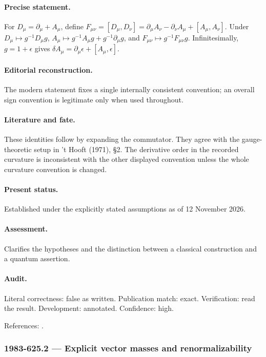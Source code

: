 \paragraph{Precise statement.} For \(D_\mu=\partial_\mu+A_\mu\), define \(F_{\mu\nu}=[D_\mu,D_\nu]=\partial_\mu A_\nu-\partial_\nu A_\mu+[A_\mu,A_\nu]\). Under \(D_\mu\mapsto g^{-1}D_\mu g\), \(A_\mu\mapsto g^{-1}A_\mu g+g^{-1}\partial_\mu g\), and \(F_{\mu\nu}\mapsto g^{-1}F_{\mu\nu}g\). Infinitesimally, \(g=1+\epsilon\) gives \(\delta A_\mu=\partial_\mu\epsilon+[A_\mu,\epsilon]\).

\paragraph{Editorial reconstruction.} The modern statement fixes a single internally consistent convention; an overall sign convention is legitimate only when used throughout.

\paragraph{Literature and fate.} These identities follow by expanding the commutator. They agree with the gauge-theoretic setup in ’t Hooft (1971), \S2. The derivative order in the recorded curvature is inconsistent with the other displayed convention unless the whole curvature convention is changed.

\paragraph{Present status.} Established under the explicitly stated assumptions as of 12 November 2026.

\paragraph{Assessment.} Clarifies the hypotheses and the distinction between a classical construction and a quantum assertion.

\paragraph{Audit.} Literal correctness: false as written. Publication match: exact. Verification: read the result. Development: annotated. Confidence: high.

\noindent References: \citep{thooft1971massive}.\par

\subsubsection{1983-625.2 --- Explicit vector masses and renormalizability}

